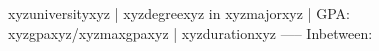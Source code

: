 \item xyzuniversityxyz | xyzdegreexyz in xyzmajorxyz | GPA: xyzgpaxyz/xyzmaxgpaxyz | xyzdurationxyz
-----
Inbetween: \vspace{2pt}
